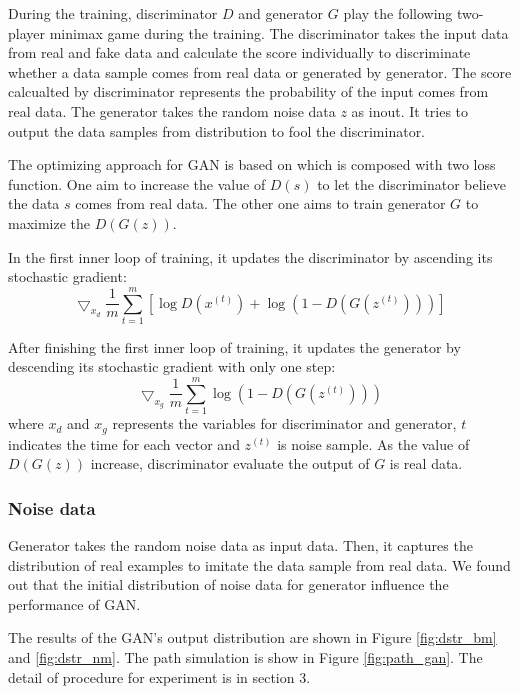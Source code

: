 \documentclass{article}
\begin{document}
	During the training, discriminator $D$ and generator $G$ play the following two-player minimax game during the training. 
	 The discriminator takes the input data from real and fake data and calculate the score individually to discriminate whether a data sample comes from real data or generated by generator. 
	 The score calcualted by discriminator represents the probability of the input comes from real data.  
	 The generator takes the random noise data $z$ as inout.
	 It tries to output the data samples from distribution to fool the discriminator.
	 
	 
	The optimizing approach for GAN is based on \cite{goodfellow} which is composed with two loss function.
	One aim to increase the value of $D(s)$ to let the discriminator believe the data $s$ comes from real data.
	The other one aims to train generator $G$ to maximize the $D(G(z))$. 

	In the first inner loop of training, 
	it updates the discriminator by ascending its stochastic gradient:
	\begin{equation}
		\bigtriangledown_{x_d} \frac{1}{m} \sum_{t=1}^{m} \left[ \log D(x^{\left(t\right)}) + \log \left(1-D\left(G\left(z^{(t)}\right)\right)\right)\right]
	\end{equation}
	
	After finishing the first inner loop of training, it updates the generator by descending its stochastic gradient with only one step:
	\begin{equation}
		\bigtriangledown_{x_g} \frac{1}{m} \sum_{t=1}^{m} \log \left(1-D\left(G\left(z^{(t)}\right)\right)\right)
		\label{fig:loss_gan}
	\end{equation}
	where $x_d$ and $x_g$ represents the variables for discriminator and generator, $t$ indicates the time for each vector and $z^{(t)}$ is noise sample.
	As the value of $D(G(z))$ increase, discriminator evaluate the output of $G$ is real data. 
	
	\subsubsection{Noise data}
	Generator  takes the random noise data as input data. 
	Then, it captures the distribution of real examples to imitate the data sample from real data. 
	We found out that the initial distribution of noise data for generator influence the performance of GAN. 
	
	The results of the GAN's output distribution are shown in Figure \ref{fig:dstr_bm} and \ref{fig:dstr_nm}. The path simulation is show in Figure \ref{fig:path_gan}. The detail of procedure for experiment is in section 3. 
	
\end{document}

